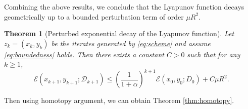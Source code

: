 \documentclass{article}
\theoremstyle{plain}
\newtheorem{theorem}{Theorem}
\theoremstyle{remark}
\newtheorem*{remark}{Remark}
\begin{document}







Combining the above results, we conclude that the Lyapunov function decays geometrically up to a bounded perturbation term of order $\mu R^2$.

\begin{theorem}[Perturbed exponential decay of the Lyapunov function]\label{coro:perturbed-decay}
Let $z_k=(x_k,y_k)$ be the iterates generated by \eqref{eq:scheme} and assume \eqref{eq:boundedness} holds. Then there exists a constant $C>0$ such that for any $k\ge 1$,
$$
\mathcal{E}(x_{k+1},y_{k+1};\mathcal D_{k+1}) \le \left(\frac{1}{1+\alpha}\right)^{k+1}\mathcal{E}(x_0,y_0;D_0) + C\mu R^2.
$$
\end{theorem}

Then using homotopy argument, we can obtain Theorem \ref{thm:homotopy}. 
\end{document}
